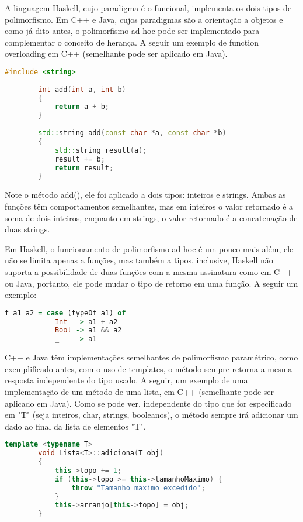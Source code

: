 \documentclass{article}
\begin{document}
    A linguagem Haskell, cujo paradigma é o funcional, implementa os dois tipos
    de polimorfismo. Em C++ e Java, cujos paradigmas são a orientação a objetos
    e como já dito antes, o polimorfismo ad hoc pode ser implementado para
    complementar o conceito de herança. A seguir um exemplo de function
    overloading em C++ (semelhante pode ser aplicado em Java).
    \begin{lstlisting}[language=C++, frame=single]
        #include <string>
        
        int add(int a, int b) 
        {
            return a + b;
        }
        
        std::string add(const char *a, const char *b)
        {
            std::string result(a);
            result += b;
            return result;
        }
    \end{lstlisting}
    
    Note o método add(), ele foi aplicado a dois tipos: inteiros e strings.
    Ambas as funções têm comportamentos semelhantes, mas em inteiros o valor
    retornado é a soma de dois inteiros, enquanto em strings, o valor retornado
    é a concatenação de duas strings.
        
    Em Haskell, o funcionamento de polimorfismo ad hoc é um pouco mais além,
    ele não se limita apenas a funções, mas também a tipos, inclusive, Haskell
    não suporta a possibilidade de duas funções com a mesma assinatura como em
    C++ ou Java, portanto, ele pode mudar o tipo de retorno em uma função. A
    seguir um exemplo:
    \begin{lstlisting}[language=Haskell, frame=single]
    f a1 a2 = case (typeOf a1) of
            Int  -> a1 + a2
            Bool -> a1 && a2
            _    -> a1
    \end{lstlisting}
        
    \newpage
    C++ e Java têm implementações semelhantes de polimorfismo paramétrico, como
    exemplificado antes, com o uso de templates, o método sempre retorna a
    mesma resposta independente do tipo usado. A seguir, um exemplo de uma
    implementação de um método de uma lista, em C++ (semelhante pode ser
    aplicado em Java). Como se pode ver, independente do tipo que for
    especificado em "T" (seja inteiros, char, strings, booleanos), o método
    sempre irá adicionar um dado ao final da lista de elementos "T".
    \begin{lstlisting}[language=C++, frame=single]
        template <typename T>
        void Lista<T>::adiciona(T obj)
        {
            this->topo += 1;
            if (this->topo >= this->tamanhoMaximo) {
                throw "Tamanho maximo excedido";
            }
            this->arranjo[this->topo] = obj;
        }
    \end{lstlisting}
        
\end{document}
